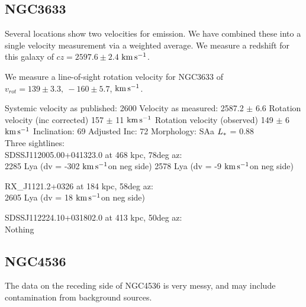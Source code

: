 \documentclass[iop]{emulateapj-rtx4}
\newcommand{\kms}{$\rm km\, s^{-1}$}
\begin{document}
%



\subsection{NGC3633}
Several locations show two velocities for emission. We have combined these into a single velocity measurement via a weighted average. We measure a redshift for this galaxy of $cz = 2597.6 \pm 2.4$ \kms. 

We measure a line-of-sight rotation velocity for NGC3633 of $v_{rot}=139\pm 3.3,~-160\pm5.7$,  \kms.


Systemic velocity as published: 2600
Velocity as measured: 2587.2 $\pm$ 6.6
Rotation velocity (inc corrected) 157 $\pm$ 11 \kms
Rotation velocity (observed) 149 $\pm$ 6 \kms
Inclination: 69
Adjusted Inc: 72
Morphology: SAa
$L_{\**}$ = 0.88 \\

Three sightlines: \\
SDSSJ112005.00+041323.0 at 468 kpc, 78deg az: \\
2285 Lya (dv = -302 \kms on neg side)
2578 Lya (dv = -9 \kms on neg side)


RX\_J1121.2+0326 at 184 kpc, 58deg az: \\
2605 Lya (dv = 18 \kms on neg side)


SDSSJ112224.10+031802.0 at 413 kpc, 50deg az: \\
Nothing


\subsection{NGC4536}
The data on the receding side of NGC4536 is very messy, and may include contamination from background sources. 

\end{document}
